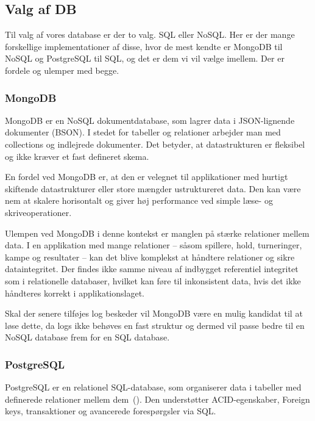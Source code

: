 \subsection{Valg af DB}

    Til valg af vores database er der to valg. SQL eller NoSQL. Her er der mange forskellige implementationer af disse,
    hvor de mest kendte er MongoDB til NoSQL og PostgreSQL til SQL, og det er dem vi vil vælge imellem. Der er fordele og
    ulemper med begge.

    \subsubsection{MongoDB}

    MongoDB er en NoSQL dokumentdatabase, som lagrer data i JSON-lignende dokumenter (BSON).
    I stedet for tabeller og relationer arbejder man med collections og indlejrede dokumenter.
    Det betyder, at datastrukturen er fleksibel og ikke kræver et fast defineret skema.

    En fordel ved MongoDB er, at den er velegnet til applikationer med hurtigt skiftende
    datastrukturer eller store mængder ustruktureret data. Den kan være nem at skalere
    horisontalt og giver høj performance ved simple læse- og skriveoperationer.

    Ulempen ved MongoDB i denne kontekst er manglen på stærke relationer mellem data.
    I en applikation med mange relationer – såsom spillere, hold, turneringer, kampe og resultater –
    kan det blive komplekst at håndtere relationer og sikre dataintegritet.
    Der findes ikke samme niveau af indbygget referentiel integritet som i relationelle databaser,
    hvilket kan føre til inkonsistent data, hvis det ikke håndteres korrekt i applikationslaget.

    Skal der senere tilføjes log beskeder vil MongoDB være en mulig kandidat til at løse dette,
    da logs ikke behøves en fast struktur og dermed vil passe bedre til en NoSQL database frem for
    en SQL database.

    \subsubsection{PostgreSQL}

    PostgreSQL er en relationel SQL-database, som organiserer data i tabeller med
    definerede relationer mellem dem~(\cite{postgres_docs2026}).
    Den understøtter ACID-egenskaber, Foreign keys, transaktioner og avancerede forespørgsler via SQL.

